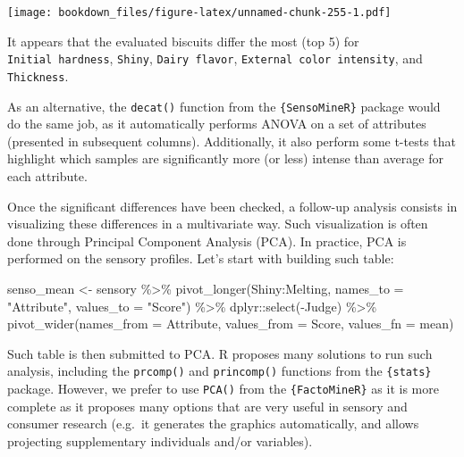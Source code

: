 \documentclass[
]{krantz}
\makeatletter
\newenvironment{Shaded}{\begin{snugshade}}{\end{snugshade}}
\newcommand{\AttributeTok}[1]{\textcolor[rgb]{0.61,0.61,0.61}{#1}}
\newcommand{\FunctionTok}[1]{\textcolor[rgb]{0,0,0}{#1}}
\newcommand{\NormalTok}[1]{#1}
\newcommand{\OtherTok}[1]{\textcolor[rgb]{0.37,0.37,0.37}{#1}}
\newcommand{\SpecialCharTok}[1]{\textcolor[rgb]{0,0,0}{#1}}
\newcommand{\StringTok}[1]{\textcolor[rgb]{0.5,0.5,0.5}{#1}}
\renewenvironment{quote}{\begin{VF}}{\end{VF}}
\newenvironment{kframe}{%
\medskip{}
\setlength{\fboxsep}{.8em}
 \def\at@end@of@kframe{}%
 \ifinner\ifhmode%
  \def\at@end@of@kframe{\end{minipage}}%
  \begin{minipage}{\columnwidth}%
 \fi\fi%
 \def\FrameCommand##1{\hskip\@totalleftmargin \hskip-\fboxsep
 \colorbox{shadecolor}{##1}\hskip-\fboxsep
     \hskip-\linewidth \hskip-\@totalleftmargin \hskip\columnwidth}%
 \MakeFramed {\advance\hsize-\width
   \@totalleftmargin\z@ \linewidth\hsize
   \@setminipage}}%
 {\par\unskip\endMakeFramed%
 \at@end@of@kframe}
\renewenvironment{Shaded}{\begin{kframe}}{\end{kframe}}
\makeatother
\begin{document}
\texttt{[image: bookdown\_files/figure-latex/unnamed-chunk-255-1.pdf]}

It appears that the evaluated biscuits differ the most (top 5) for \texttt{Initial\ hardness}, \texttt{Shiny}, \texttt{Dairy\ flavor}, \texttt{External\ color\ intensity}, and \texttt{Thickness}.

\begin{quote}
As an alternative, the \texttt{decat()} function from the \texttt{\{SensoMineR\}} package would do the same job, as it automatically performs ANOVA on a set of attributes (presented in subsequent columns). Additionally, it also perform some t-tests that highlight which samples are significantly more (or less) intense than average for each attribute.
\end{quote}

Once the significant differences have been checked, a follow-up analysis consists in visualizing these differences in a multivariate way. Such visualization is often done through Principal Component Analysis (PCA). In practice, PCA is performed on the sensory profiles. Let's start with building such table:

\begin{Shaded}
\begin{Highlighting}[]
\NormalTok{senso\_mean }\OtherTok{\textless{}{-}}\NormalTok{ sensory }\SpecialCharTok{\%\textgreater{}\%}
  \FunctionTok{pivot\_longer}\NormalTok{(Shiny}\SpecialCharTok{:}\NormalTok{Melting, }
               \AttributeTok{names\_to =} \StringTok{"Attribute"}\NormalTok{, }\AttributeTok{values\_to =} \StringTok{"Score"}\NormalTok{) }\SpecialCharTok{\%\textgreater{}\%}
\NormalTok{  dplyr}\SpecialCharTok{::}\FunctionTok{select}\NormalTok{(}\SpecialCharTok{{-}}\NormalTok{Judge) }\SpecialCharTok{\%\textgreater{}\%}
  \FunctionTok{pivot\_wider}\NormalTok{(}\AttributeTok{names\_from =}\NormalTok{ Attribute, }\AttributeTok{values\_from =}\NormalTok{ Score, }
              \AttributeTok{values\_fn =}\NormalTok{ mean)}
\end{Highlighting}
\end{Shaded}

Such table is then submitted to PCA. R proposes many solutions to run such analysis, including the \texttt{prcomp()} and \texttt{princomp()} functions from the \texttt{\{stats\}} package. However, we prefer to use \texttt{PCA()} from the \texttt{\{FactoMineR\}} as it is more complete as it proposes many options that are very useful in sensory and consumer research (e.g.~it generates the graphics automatically, and allows projecting supplementary individuals and/or variables).
\end{document}
